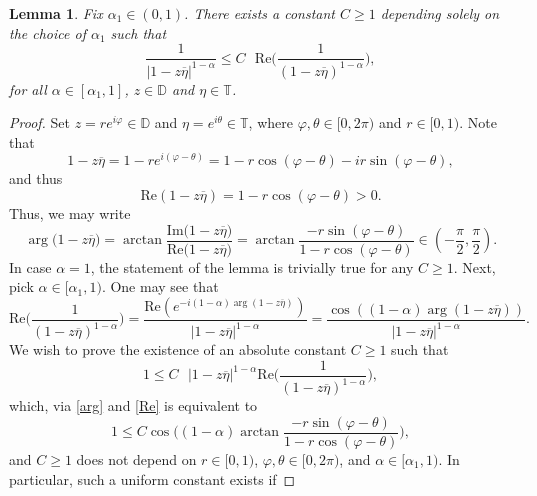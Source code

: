 \documentclass[12pt]{amsart}
\newtheorem{lemma}[theorem]{Lemma}
\theoremstyle{definition}\newtheorem{remark}[theorem]{Remark}
\theoremstyle{definition}\newtheorem{example}[theorem]{Example}
\theoremstyle{definition}\newtheorem{definition}{Definition}
\numberwithin{equation}{section}
\newcommand\DD{{\mathbb D}}
\newcommand\TT{{\mathbb T}}
\begin{document}
\begin{lemma}\label{Real estimation}
Fix $\alpha_1\in (0,1)$. There exists a constant $C\ge1$ depending solely on the choice of $\alpha_1$ such that
\begin{equation*}
\frac{1}{|1-z\overline{\eta}|^{1-\alpha}}\leq C \text{ }\mathrm{Re}\Big(\frac{1}{(1-z\overline{\eta})^{1-\alpha}}\Big),  
\end{equation*} 
for all $\alpha\in [\alpha_1,1]$, $z\in\DD$ and $\eta\in\TT$.
\end{lemma}
\begin{proof}
Set $z=re^{i\varphi}\in\DD$ and $\eta=e^{i\theta}\in \TT$, where $\varphi,\theta\in [0,2\pi)$ and $r\in[0,1)$. Note that
\begin{equation*}
1-z\overline{\eta}=1-re^{i(\varphi-\theta)}=1-r\cos(\varphi-\theta)-ir\sin(\varphi-\theta),
\end{equation*}
and thus
\begin{equation*}
  \mathrm{Re}(1-z\overline{\eta})=1-r\cos(\varphi-\theta)>0.  
\end{equation*}
Thus, we may write
\begin{equation}\label{arg}
\arg{(1-z\overline{\eta}})=\arctan\frac{\mathrm{Im}{(1-z\overline{\eta}})}{\mathrm{Re}{(1-z\overline{\eta}})}=\arctan\frac{-r\sin(\varphi-\theta)}{1-r\cos(\varphi-\theta)}\in\left(-\frac{\pi}{2},\frac{\pi}{2}\right).
\end{equation}
In case $\alpha=1$, the statement of the lemma is trivially true for any $C\ge1$. Next, pick $\alpha\in [\alpha_1,1)$. One may see that
\begin{equation}\label{Re}
\mathrm{Re}\Big(\frac{1}{(1-z\overline{\eta})^{1-\alpha}}\Big)=\frac{\mathrm{Re}(e^{-i(1-\alpha)\arg(1-z\overline{\eta})})}{|1-z\overline{\eta}|^{1-\alpha}}=\frac{\cos((1-\alpha)\arg(1-z\overline{\eta}))}{|1-z\overline{\eta}|^{1-\alpha}}.
\end{equation}
We wish to prove the existence of an absolute constant $C\ge1$ such that 
\begin{equation*}
   1\leq C \text{ }|1-z\overline{\eta}|^{1-\alpha}\mathrm{Re}\Big(\frac{1}{(1-z\overline{\eta})^{1-\alpha}}\Big), 
\end{equation*}
which, via \eqref{arg} and \eqref{Re} is equivalent to
\begin{equation*}
1\leq C\cos{\Big((1-\alpha) \arctan\frac{-r\sin(\varphi-\theta)}{1-r\cos(\varphi-\theta)}\Big)},
\end{equation*}
and $C\ge1$ does not depend on $r\in [0,1)$, $\varphi,\theta\in [0,2\pi)$, and $\alpha\in [\alpha_1,1)$. In particular, such a uniform constant exists if

\end{proof}
\end{document}
